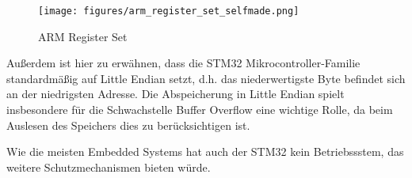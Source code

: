 \documentclass[a4paper,
DIV=13,
12pt,
BCOR=10mm,
department=FakIM,
oneside,
parskip=half,
automark,
listof=totocnumbered,
bibliography=totocnumbered,
acronym=totocnumbered
] {OTHRartcl}
\begin{document}
\begin{figure}[ht!]
\begin{center}
  \texttt{[image: figures/arm\_register\_set\_selfmade.png]}
  \caption{ARM Register Set}
  \label{fig: ARM Register Set}
\end{center}
\end{figure}



Außerdem ist hier zu erwähnen, dass die STM32 Mikrocontroller-Familie standardmäßig auf Little Endian setzt, d.h. das niederwertigste Byte befindet sich an der niedrigsten Adresse.
Die Abspeicherung in Little Endian spielt insbesondere für die Schwachstelle Buffer Overflow eine wichtige Rolle, da beim Auslesen des
Speichers dies zu berücksichtigen ist.

Wie die meisten Embedded Systems hat auch der STM32 kein Betriebssstem, das weitere Schutzmechanismen bieten würde.


\end{document}
